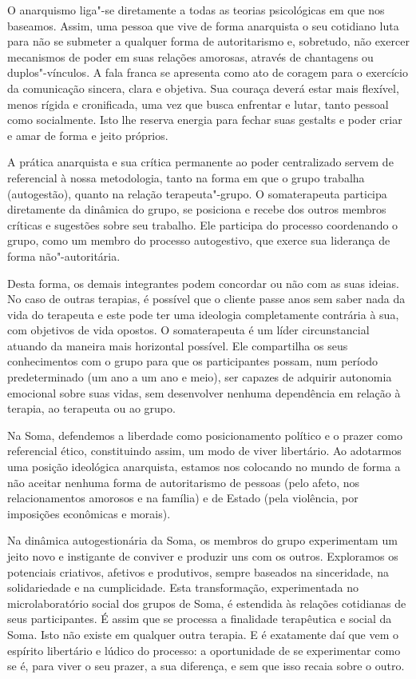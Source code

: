 O anarquismo liga"-se diretamente a todas as teorias psicológicas em que
nos baseamos. Assim, uma pessoa que vive de forma anarquista o seu
cotidiano luta para não se submeter a qualquer forma de autoritarismo e,
sobretudo, não exercer mecanismos de poder em suas relações amorosas,
através de chantagens ou duplos"-vínculos. A fala franca se apresenta
como ato de coragem para o exercício da comunicação sincera, clara e
objetiva. Sua couraça deverá estar mais flexível, menos rígida e
cronificada, uma vez que busca enfrentar e lutar, tanto pessoal como
socialmente. Isto lhe reserva energia para fechar suas gestalts e poder criar
e amar de forma e jeito próprios.

A prática anarquista e sua crítica permanente ao poder centralizado
servem de referencial à nossa metodologia, tanto na forma em que o grupo
trabalha (autogestão), quanto na relação terapeuta"-grupo. O
somaterapeuta participa diretamente da dinâmica do grupo, se posiciona e
recebe dos outros membros críticas e sugestões sobre seu trabalho. Ele
participa do processo coordenando o grupo, como um membro do processo
autogestivo, que exerce sua liderança de forma não"-autoritária.

Desta forma, os demais integrantes podem concordar ou não com as suas
ideias. No caso de outras terapias, é possível que o cliente passe anos
sem saber nada da vida do terapeuta e este pode ter uma ideologia
completamente contrária à sua, com objetivos de vida opostos. O
somaterapeuta é um líder circunstancial atuando da maneira mais
horizontal possível. Ele compartilha os seus conhecimentos com o grupo
para que os participantes possam, num período predeterminado (um ano a
um ano e meio), ser capazes de adquirir autonomia emocional sobre suas
vidas, sem desenvolver nenhuma dependência em relação à terapia, ao
terapeuta ou ao grupo.

Na Soma, defendemos a liberdade como posicionamento político e o prazer
como referencial ético, constituindo assim, um modo de viver libertário.
Ao adotarmos uma posição ideológica anarquista, estamos nos colocando no
mundo de forma a não aceitar nenhuma forma de autoritarismo de pessoas
(pelo afeto, nos relacionamentos amorosos e na família) e de Estado
(pela violência, por imposições econômicas e morais).

Na dinâmica autogestionária da Soma, os membros do grupo experimentam um
jeito novo e instigante de conviver e produzir uns com os outros.
Exploramos os potenciais criativos, afetivos e produtivos, sempre
baseados na sinceridade, na solidariedade e na cumplicidade. Esta
transformação, experimentada no microlaboratório social dos grupos de
Soma, é estendida às relações cotidianas de seus participantes. É assim
que se processa a finalidade terapêutica e social da Soma. Isto não
existe em qualquer outra terapia. E é exatamente daí que vem o espírito
libertário e lúdico do processo: a oportunidade de se experimentar como
se é, para viver o seu prazer, a sua diferença, e sem que isso recaia
sobre o outro.

